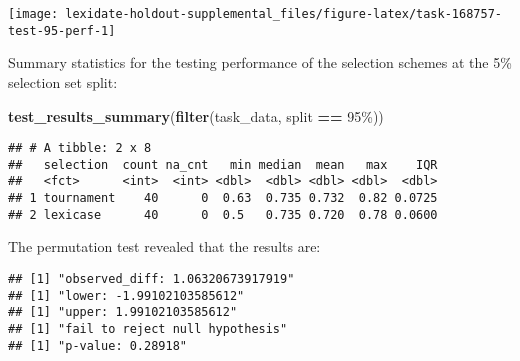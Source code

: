 \documentclass[
]{book}
\newenvironment{Shaded}{\begin{snugshade}}{\end{snugshade}}
\newcommand{\AttributeTok}[1]{\textcolor[rgb]{0.13,0.29,0.53}{#1}}
\newcommand{\DecValTok}[1]{\textcolor[rgb]{0.00,0.00,0.81}{#1}}
\newcommand{\FunctionTok}[1]{\textcolor[rgb]{0.13,0.29,0.53}{\textbf{#1}}}
\newcommand{\NormalTok}[1]{#1}
\newcommand{\OtherTok}[1]{\textcolor[rgb]{0.56,0.35,0.01}{#1}}
\newcommand{\SpecialCharTok}[1]{\textcolor[rgb]{0.81,0.36,0.00}{\textbf{#1}}}
\newcommand{\StringTok}[1]{\textcolor[rgb]{0.31,0.60,0.02}{#1}}
\begin{document}
\texttt{[image: lexidate-holdout-supplemental\_files/figure-latex/task-168757-test-95-perf-1]}

Summary statistics for the testing performance of the selection schemes at the 5\% selection set split:

\begin{Shaded}
\begin{Highlighting}[]
\FunctionTok{test\_results\_summary}\NormalTok{(}\FunctionTok{filter}\NormalTok{(task\_data, split }\SpecialCharTok{==} \StringTok{\textquotesingle{}95\%\textquotesingle{}}\NormalTok{))}
\end{Highlighting}
\end{Shaded}

\begin{verbatim}
## # A tibble: 2 x 8
##   selection  count na_cnt   min median  mean   max    IQR
##   <fct>      <int>  <int> <dbl>  <dbl> <dbl> <dbl>  <dbl>
## 1 tournament    40      0  0.63  0.735 0.732  0.82 0.0725
## 2 lexicase      40      0  0.5   0.735 0.720  0.78 0.0600
\end{verbatim}

The permutation test revealed that the results are:

\begin{Shaded}
\end{Shaded}

\begin{verbatim}
## [1] "observed_diff: 1.06320673917919"
## [1] "lower: -1.99102103585612"
## [1] "upper: 1.99102103585612"
## [1] "fail to reject null hypothesis"
## [1] "p-value: 0.28918"
\end{verbatim}
\end{document}
